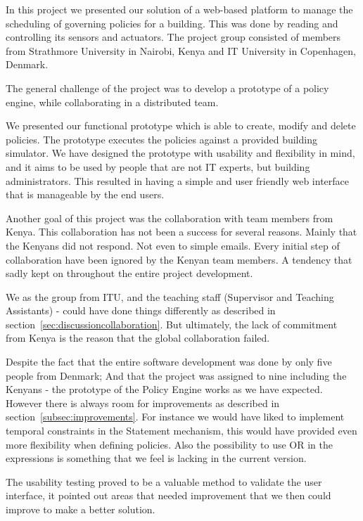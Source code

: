 In this project we presented our solution of a web-based platform to manage the scheduling of governing policies for a building. This was done by reading and controlling its sensors and actuators. The project group consisted of members from Strathmore University in Nairobi, Kenya and IT University in Copenhagen, Denmark.

The general challenge of the project was to develop a prototype of a policy engine, while collaborating in a distributed team. 

We presented our functional prototype which is able to create, modify and delete policies. The prototype executes the policies against a provided building simulator. We have designed the prototype with usability and flexibility in mind, and it aims to be used by people that are not IT experts, but building administrators. This resulted in having a simple and user friendly web interface that is manageable by the end users. 

Another goal of this project was the collaboration with team members from Kenya. This collaboration has not been a success for several reasons. Mainly that the Kenyans did not respond. Not even to simple emails. Every initial step of collaboration have been ignored by the Kenyan team members. A tendency that sadly kept on throughout the entire project development.

We as the group from ITU, and the teaching staff (Supervisor and Teaching Assistants) - could have done things differently as described in section~\ref{sec:discussioncollaboration}. But ultimately, the lack of commitment from Kenya is the reason that the global collaboration failed.

Despite the fact that the entire software development was done by only five people from Denmark; And that the project was assigned to nine including the Kenyans - the prototype of the Policy Engine works as we have expected. However there is always room for improvements as described in section~\ref{subsec:improvements}. For instance we would have liked to implement temporal constraints in the Statement mechanism, this would have provided even more flexibility when defining policies. Also the possibility to use OR in the expressions is something that we feel is lacking in the current version.

The usability testing proved to be a valuable method to validate the user interface, it pointed out areas that needed improvement that we then could improve to make a better solution.